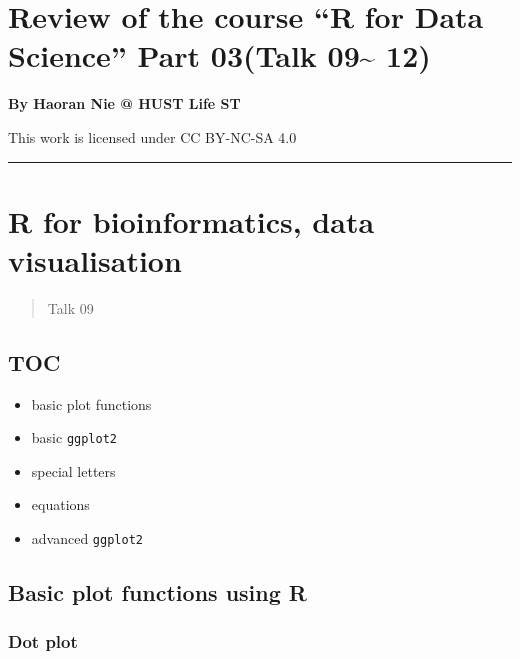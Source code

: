 \documentclass[
]{article}
\author{}
\date{}
\begin{document}
\hypertarget{review-of-the-course-r-for-data-science-part-03talk-09-12}{%
\section{Review of the course ``R for Data Science'' Part 03(Talk
09\textasciitilde{}
12)}\label{review-of-the-course-r-for-data-science-part-03talk-09-12}}

\textbf{By Haoran Nie @ HUST Life ST}

This work is licensed under CC BY-NC-SA 4.0

\begin{center}\rule{0.5\linewidth}{0.5pt}\end{center}

\hypertarget{r-for-bioinformatics-data-visualisation}{%
\section{R for bioinformatics, data
visualisation}\label{r-for-bioinformatics-data-visualisation}}

\begin{quote}
Talk 09
\end{quote}

\hypertarget{toc}{%
\subsection{TOC}\label{toc}}

\begin{itemize}
\item
  basic plot functions
\item
  basic \texttt{ggplot2}
\item
  special letters
\item
  equations
\item
  advanced \texttt{ggplot2}
\end{itemize}

\hypertarget{basic-plot-functions-using-r}{%
\subsection{Basic plot functions using
R}\label{basic-plot-functions-using-r}}

\hypertarget{dot-plot}{%
\subsubsection{Dot plot}\label{dot-plot}}
\end{document}
